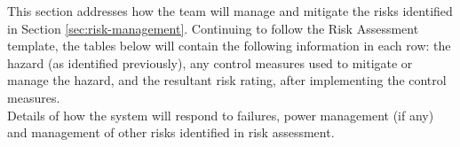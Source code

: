 \label{sec:risk-management}
This section addresses how the team will manage and mitigate the risks identified in Section \ref{sec:risk-management}. Continuing to follow the Risk Assessment template, the tables below will contain the following information in each row: the hazard (as identified previously), any control measures used to mitigate or manage the hazard, and the resultant risk rating, after implementing the control measures.\\

Details of how the system will respond to failures, power management (if any) and management of other risks identified in risk assessment.

